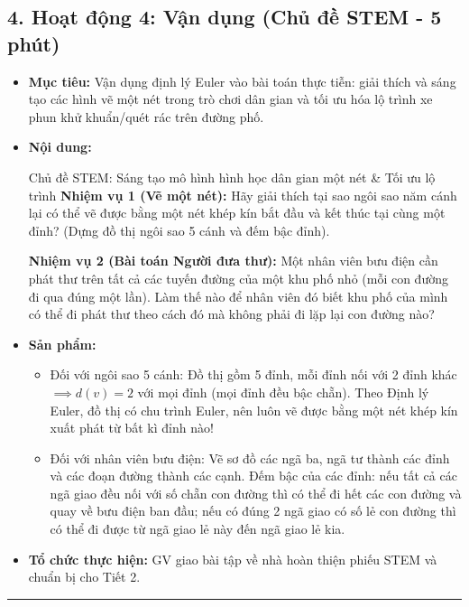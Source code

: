 \documentclass[12pt, a4paper]{article}
\begin{document}
\subsection*{4. Hoạt động 4: Vận dụng (Chủ đề STEM - 5 phút)}

\begin{itemize}[leftmargin=1.2cm]
    \item[a)] \textbf{Mục tiêu:} Vận dụng định lý Euler vào bài toán thực tiễn: giải thích và sáng tạo các hình vẽ một nét trong trò chơi dân gian và tối ưu hóa lộ trình xe phun khử khuẩn/quét rác trên đường phố.
    \item[b)] \textbf{Nội dung:}
    \begin{stembox}{Chủ đề STEM: Sáng tạo mô hình hình học dân gian một nét \& Tối ưu lộ trình}
        \textbf{Nhiệm vụ 1 (Vẽ một nét):} Hãy giải thích tại sao ngôi sao năm cánh lại có thể vẽ được bằng một nét khép kín bắt đầu và kết thúc tại cùng một đỉnh? (Dựng đồ thị ngôi sao 5 cánh và đếm bậc đỉnh).
        
        \textbf{Nhiệm vụ 2 (Bài toán Người đưa thư):} Một nhân viên bưu điện cần phát thư trên tất cả các tuyến đường của một khu phố nhỏ (mỗi con đường đi qua đúng một lần). Làm thế nào để nhân viên đó biết khu phố của mình có thể đi phát thư theo cách đó mà không phải đi lặp lại con đường nào?
    \end{stembox}
    \item[c)] \textbf{Sản phẩm:}
    \begin{itemize}[leftmargin=0.6cm]
        \item Đối với ngôi sao 5 cánh: Đồ thị gồm 5 đỉnh, mỗi đỉnh nối với 2 đỉnh khác $\implies d(v) = 2$ với mọi đỉnh (mọi đỉnh đều bậc chẵn). Theo Định lý Euler, đồ thị có chu trình Euler, nên luôn vẽ được bằng một nét khép kín xuất phát từ bất kì đỉnh nào!
        \item Đối với nhân viên bưu điện: Vẽ sơ đồ các ngã ba, ngã tư thành các đỉnh và các đoạn đường thành các cạnh. Đếm bậc của các đỉnh: nếu tất cả các ngã giao đều nối với số chẵn con đường thì có thể đi hết các con đường và quay về bưu điện ban đầu; nếu có đúng 2 ngã giao có số lẻ con đường thì có thể đi được từ ngã giao lẻ này đến ngã giao lẻ kia.
    \end{itemize}
    \item[d)] \textbf{Tổ chức thực hiện:} GV giao bài tập về nhà hoàn thiện phiếu STEM và chuẩn bị cho Tiết 2.
\end{itemize}

\vspace{10pt}
\hrule
\vspace{10pt}
\end{document}
